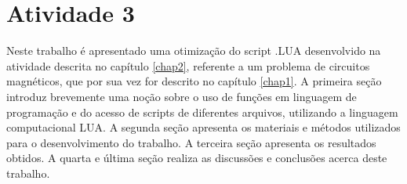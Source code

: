 \chapter{Atividade 3}
\label{chap3}
Neste trabalho é apresentado uma otimização do script .LUA desenvolvido na atividade descrita no capítulo \ref{chap2}, referente a um problema de circuitos magnéticos, que por sua vez for descrito no capítulo \ref{chap1}. A primeira seção introduz brevemente uma noção sobre o uso de funções em linguagem de programação e do acesso de scripts de diferentes arquivos, utilizando a linguagem computacional LUA. A segunda seção apresenta os materiais e métodos utilizados para o desenvolvimento do trabalho. A terceira seção apresenta os resultados obtidos. A quarta e última seção realiza as discussões e conclusões acerca deste trabalho.
\newpage
\pagebreak




